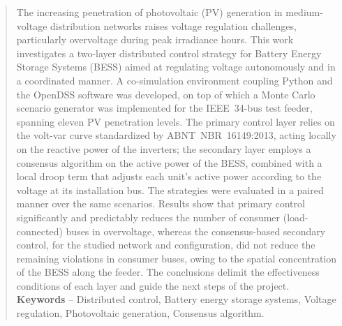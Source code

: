 \documentclass[pnumromarab,normalnum,abnttoc,times]{politex}
\begin{document}
\begin{abstract}
The increasing penetration of photovoltaic (PV) generation in medium-voltage 
distribution networks raises voltage regulation challenges, particularly 
overvoltage during peak irradiance hours. This work investigates a two-layer 
distributed control strategy for Battery Energy Storage Systems (BESS) aimed 
at regulating voltage autonomously and in a coordinated manner. A 
co-simulation environment coupling Python and the OpenDSS software was 
developed, on top of which a Monte Carlo scenario generator was implemented 
for the IEEE~34-bus test feeder, spanning eleven PV penetration levels. The 
primary control layer relies on the volt-var curve standardized by 
ABNT~NBR~16149:2013, acting locally on the reactive power of the inverters; 
the secondary layer employs a consensus algorithm on the active power of the
BESS, combined with a local droop term that adjusts each unit's active power
according to the voltage at its installation bus. The strategies were evaluated in a paired
manner over the same scenarios. Results show that primary control 
significantly and predictably reduces the number of consumer (load-connected) 
buses in overvoltage, whereas the consensus-based secondary control, for the 
studied network and configuration, did not reduce the remaining violations in 
consumer buses, 
owing to the spatial concentration of the BESS along the feeder. The 
conclusions delimit the effectiveness conditions of each layer and guide the next steps of the project.
%
\\[3\baselineskip]
%
\textbf{Keywords} -- Distributed control, Battery energy storage systems, Voltage regulation, Photovoltaic generation, Consensus algorithm.
\end{abstract}

\listadefiguras
\listadetabelas
\end{document}
